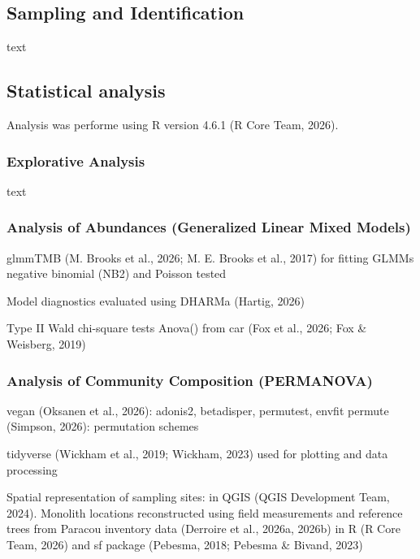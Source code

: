 \documentclass[
  american,
  11pt,
]{stylisharticle}
\begin{document}
\subsection{Sampling and
Identification}\label{sampling-and-identification}

text

\subsection{Statistical analysis}\label{statistical-analysis}

Analysis was performe using R version 4.6.1 (R Core Team, 2026).

\subsubsection{Explorative Analysis}\label{explorative-analysis}

text

\subsubsection{Analysis of Abundances (Generalized Linear Mixed
Models)}\label{analysis-of-abundances-generalized-linear-mixed-models}

glmmTMB ({M. Brooks et al.}, 2026; {M. E. Brooks et al.}, 2017) for
fitting GLMMs negative binomial (NB2) and Poisson tested

Model diagnostics evaluated using DHARMa (Hartig, 2026)

Type II Wald chi-square tests Anova() from car (Fox et al., 2026; Fox \&
Weisberg, 2019)

\subsubsection{Analysis of Community Composition
(PERMANOVA)}\label{analysis-of-community-composition-permanova}

vegan (Oksanen et al., 2026): adonis2, betadisper, permutest, envfit
permute (Simpson, 2026): permutation schemes

tidyverse (Wickham et al., 2019; Wickham, 2023) used for plotting and
data processing

Spatial representation of sampling sites: in QGIS (QGIS Development
Team, 2024). Monolith locations reconstructed using field measurements
and reference trees from Paracou inventory data (Derroire et al., 2026a,
2026b) in R (R Core Team, 2026) and sf package (Pebesma, 2018; Pebesma
\& Bivand, 2023)
\end{document}
